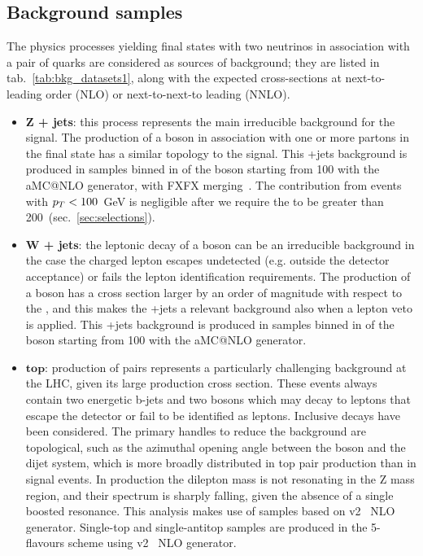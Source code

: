 \subsection{Background samples}\label{ssec:backgrounds}

The physics processes yielding final states with two neutrinos in association with a pair of quarks are considered as sources of background; they are listed in tab.~\ref{tab:bkg_datasets1}, along with the expected cross-sections at next-to-leading order (NLO) or next-to-next-to leading (NNLO).

\begin{itemize}
  \item {\bf Z + jets}: this process represents the main irreducible background for the signal. The production of a \Z boson in association with one or more partons in the final state has a similar topology to the signal. This \Z+jets background is produced in samples binned in \pt of the \Z boson starting from 100 \GeV with the {\sc aMC@NLO} generator, with FXFX merging~\cite{bib:FXFX}. The contribution from events with $p_T<100$~GeV is negligible after we require the \met to be greater than 200~\GeV (sec.~\ref{sec:selections}).

  \item {\bf W + jets}: the leptonic decay of a \W boson can be an irreducible background in the case the charged lepton escapes undetected (e.g. outside the detector acceptance) or fails the lepton identification requirements. The production of a \W boson has a cross section larger by an order of magnitude with respect to the \Z, and this makes the \W+jets a relevant background also when a lepton veto is applied. This \W+jets background is produced in samples binned in \pt of the \W boson starting from 100 \GeV with the {\sc aMC@NLO} generator.%
\color{red}
  \item $\mathbf{top}$: production of \ttbar pairs represents a particularly challenging background at the LHC, given its large production cross section. These events always contain two energetic b-jets and two \W bosons which may decay to leptons that escape the detector or fail to be identified as leptons. Inclusive \ttbar decays have been considered. The primary handles to reduce the \ttbar background are topological, such as the azimuthal opening angle between the \Z boson and the dijet system, which is more broadly distributed in top pair production than in signal events. In \ttbar production the dilepton mass is not resonating in the Z mass region, and their \pt spectrum is sharply falling, given the absence of a single boosted resonance. This analysis makes use of \ttbar samples based on \POWHEG v2~\cite{bib:POWHEGst} NLO generator.
  Single-top and single-antitop samples are produced in the 5-flavours scheme using \POWHEG v2~\cite{bib:POWHEGtt} NLO generator.
  

\end{itemize}
